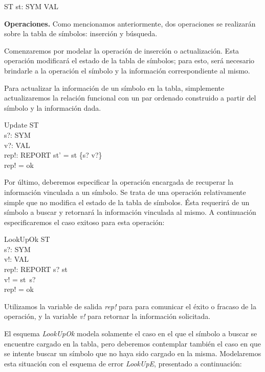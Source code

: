 \begin{schema}{ST}
st: SYM \pfun VAL
\end{schema}

\bigskip
\noindent
\textbf{Operaciones.} Como mencionamos anteriormente, dos operaciones se realizarán sobre la tabla de símbolos: inserción y búsqueda.

\bigskip
Comenzaremos por modelar la operación de inserción o actualización. Esta operación modificará el estado de la tabla de símbolos; para esto, será necesario brindarle a la operación el símbolo y la información correspondiente al mismo.

Para actualizar la información de un símbolo en la tabla, simplemente actualizaremos la relación funcional con un par ordenado construido a partir del símbolo y la información dada. 

\begin{schema}{Update}
  \Delta ST \\
  s?: SYM \\
  v?: VAL \\
  rep!: REPORT
  \where
  st' = st \oplus \{s? \mapsto v?\} \\
  rep! = ok
\end{schema}

Por último, deberemos especificar la operación encargada de recuperar la información vinculada a un símbolo. Se trata de una operación relativamente simple que no modifica el estado de la tabla de símbolos. Ésta requerirá de un símbolo a buscar y retornará la información vinculada al mismo. A continuación especificaremos el caso exitoso para esta operación:

\begin{schema}{LookUpOk}
\Xi ST \\
s?: SYM \\
v!: VAL \\
rep!: REPORT
\where
s? \in \dom st \\
v! = st~s? \\
rep! = ok
\end{schema} 

Utilizamos la variable de salida \emph{rep!} para para comunicar el éxito o fracaso de la operación, y la variable \emph{v!} para retornar la información solicitada. 

El esquema \emph{LookUpOk} modela solamente el caso en el que el símbolo a buscar se encuentre cargado en la tabla, pero deberemos contemplar también el caso en que se intente buscar un símbolo que no haya sido cargado en la misma. Modelaremos esta situación con el esquema de error \emph{LookUpE}, presentado a continuación:

